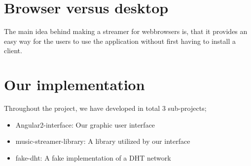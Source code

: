 \section{Browser versus desktop}
The main idea behind making a streamer for webbrowsers is, that it provides an easy way for the users to use the application without first having to install a client.

\section{Our implementation}
Throughout the project, we have developed in total 3 sub-projects;
\begin{itemize}
\item Angular2-interface: Our graphic user interface
\item music-streamer-library: A library utilized by our interface
\item fake-dht: A fake implementation of a DHT network
\end{itemize}




